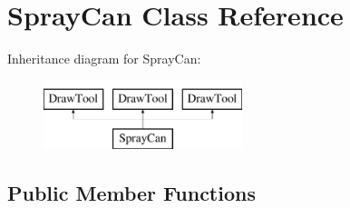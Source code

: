 \hypertarget{classSprayCan}{\section{Spray\-Can Class Reference}
\label{classSprayCan}
}
Inheritance diagram for Spray\-Can\-:\begin{figure}[H]
\begin{center}
\leavevmode
\includegraphics[height=2.000000cm]{classSprayCan}
\end{center}
\end{figure}
\subsection*{Public Member Functions}
